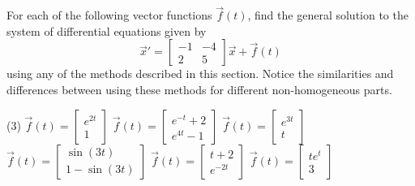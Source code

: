 \documentclass{ximera}
\begin{document}
\begin{exercise}
    For each of the following vector functions $\vec{f}(t)$, find the general solution to the system of differential equations given by
    \[ {\vec{x}}' = \begin{bmatrix} -1 & -4 \\ 2 & 5 \end{bmatrix} \vec{x} + \vec{f}(t)\] using any of the methods described in this section. Notice the similarities and differences between using these methods for different non-homogeneous parts.
    \begin{tasks}(3)
        \task $\vec{f}(t) = \begin{bmatrix} e^{2t} \\ 1 \end{bmatrix}$
        \task $\vec{f}(t) = \begin{bmatrix} e^{-t} + 2 \\ e^{4t} - 1 \end{bmatrix}$
        \task $\vec{f}(t) = \begin{bmatrix} e^{3t} \\ t \end{bmatrix}$
        \task $\vec{f}(t) = \begin{bmatrix} \sin(3t) \\ 1 - \sin(3t) \end{bmatrix}$
        \task $\vec{f}(t) = \begin{bmatrix} t + 2 \\ e^{-2t} \end{bmatrix}$
        \task $\vec{f}(t) = \begin{bmatrix} te^{t} \\ 3 \end{bmatrix}$
    \end{tasks} 
\end{exercise}
\end{document}
